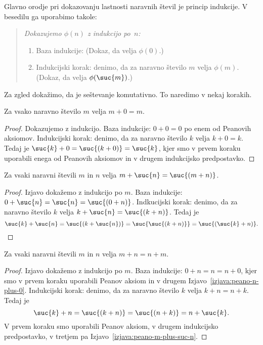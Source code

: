 Glavno orodje pri dokazovanju lastnosti naravnih števil je princip
indukcije. V besedilu ga uporabimo takole:
%
\begin{quote}
  \em
  Dokazujemo $\phi(n)$ z indukcijo po~$n$:
  \begin{enumerate}
    \item Baza indukcije: (Dokaz, da velja $\phi(0)$.)
    \item Indukcijski korak: denimo, da za naravno število $m$ velja
      $\phi(m)$. (Dokaz, da velja $\phi(\suc{m})$.)
  \end{enumerate}
\end{quote}
%
Za zgled dokažimo, da je seštevanje komutativno. To naredimo v nekaj
korakih.

\begin{izjava}
  \label{izjava:peano-n-plus-0}
  Za vsako naravno število $m$ velja $m + 0 = m$.
\end{izjava}

\begin{proof}
  Dokazujemo z indukcijo. Baza indukcije: $0 + 0 = 0$ po enem od
  Peanovih aksiomov.
  Indukcijski korak: denimo, da za naravno število $k$ velja $k + 0 =
  k$. Tedaj je $\suc{k} + 0 = \suc{(k + 0)} = \suc{k}$, kjer smo v
  prvem koraku uporabili enega od Peanovih aksiomov in v drugem
  indukcijsko predpostavko.
\end{proof}


\begin{izjava}
  \label{izjava:peano-m-plus-suc-n}
  Za vsaki naravni števili $m$ in $n$ velja $m + \suc{n} = \suc{(m + n)}$.
\end{izjava}

\begin{proof}
  Izjavo dokažemo z indukcijo po $m$.
  Baza indukcije: $0 + \suc{n} = \suc{n} = \suc{(0 + n)}$.
  Indkucijski korak: denimo, da za naravno število $k$ velja $k +
  \suc{n} = \suc{(k + n)}$. Tedaj je
  \begin{equation*}
    \suc{k} + \suc{n} = 
    \suc{(k + \suc{n})} =
    \suc{{\suc{(k + n)}}} =
    \suc{(\suc{k} + n)}.
  \end{equation*}
\end{proof}

\begin{izjava}
  Za vsaki naravni števili $m$ in $n$ velja $m + n = n + m$.
\end{izjava}

\begin{proof}
  Izjavo dokažemo z indukcijo po $m$.
  Baza indukcije: $0 + n = n = n + 0$, kjer smo v prvem koraku uporabili Peanov aksiom in v drugem Izjavo~\ref{izjava:peano-n-plus-0}.
  Indukcijski korak: denimo, da za naravno število $k$ velja $k + n = n + k$. Tedaj je
  \begin{equation*}
    \suc{k} + n =
    \suc{(k + n)} =
    \suc{(n + k)} =
    n + \suc{k}.
  \end{equation*}
  V prvem koraku smo uporabili Peanov aksiom, v drugem indukcijsko predpostavko, v tretjem pa Izjavo~\ref{izjava:peano-m-plus-suc-n}.
\end{proof}

